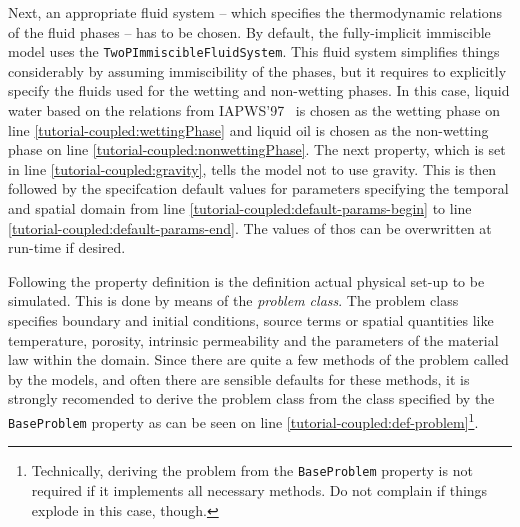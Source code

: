 Next, an appropriate fluid system -- which specifies the thermodynamic
relations of the fluid phases -- has to be chosen. By default, the
fully-implicit immiscible model uses the
\texttt{TwoPImmiscibleFluidSystem}. This fluid system simplifies
things considerably by assuming immiscibility of the phases, but it
requires to explicitly specify the fluids used for the wetting and
non-wetting phases. In this case, liquid water based on the relations
from IAPWS'97~\cite{IAPWS1997} is chosen as the wetting phase on line
\ref{tutorial-coupled:wettingPhase} and liquid oil is chosen as the
non-wetting phase on line \ref{tutorial-coupled:nonwettingPhase}. The
next property, which is set in line \ref{tutorial-coupled:gravity},
tells the model not to use gravity. This is then followed by the
specifcation default values for parameters specifying the temporal and
spatial domain from line \ref{tutorial-coupled:default-params-begin}
to line \ref{tutorial-coupled:default-params-end}.  The values of thos
can be overwritten at run-time if desired.

Following the property definition is the definition actual physical
set-up to be simulated. This is done by means of the \textit{problem
  class}. The problem class specifies boundary and initial conditions,
source terms or spatial quantities like temperature, porosity,
intrinsic permeability and the parameters of the material law within
the domain. Since there are quite a few methods of the problem called
by the \eWoms models, and often there are sensible defaults for these
methods, it is strongly recomended to derive the problem class from
the class specified by the \texttt{BaseProblem} property as can be
seen on line \ref{tutorial-coupled:def-problem}\footnote{Technically,
  deriving the problem from the \texttt{BaseProblem} property is not
  required if it implements all necessary methods. Do not complain if
  things explode in this case, though.}.

